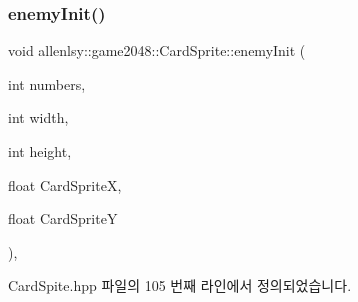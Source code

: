 \subsubsection{\texorpdfstring{enemy\+Init()}{enemyInit()}}
{\footnotesize\ttfamily void allenlsy\+::game2048\+::\+Card\+Sprite\+::enemy\+Init (\begin{DoxyParamCaption}\item[{int}]{numbers,  }\item[{int}]{width,  }\item[{int}]{height,  }\item[{float}]{Card\+SpriteX,  }\item[{float}]{Card\+SpriteY }\end{DoxyParamCaption})\hspace{0.3cm}{\ttfamily [inline]}, {\ttfamily [private]}}



Card\+Spite.\+hpp 파일의 105 번째 라인에서 정의되었습니다.


